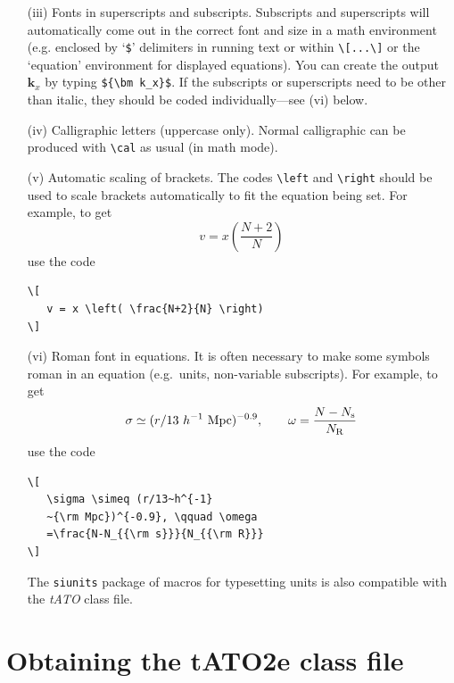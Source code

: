 \documentclass{tATO2e}
\begin{document}
\begin{enumerate}
\noindent you would use the following code:

\begin{verbatim}
The high-resolution observations were made along a line at an
angle of $-15^\circ$ (East from North) from the axis of the
jet---which runs North--South
\end{verbatim}

\item[(iii)] Fonts in superscripts and subscripts. Subscripts and superscripts will automatically come  out in the correct font
and size in a math environment (e.g. enclosed by `\verb"$"'
delimiters in running text or within \verb"\[...\]" or the
`equation' environment for displayed equations). You can create
the output ${\bm k_x}$ by typing \verb"${\bm k_x}$". If the
subscripts or superscripts need to be other than italic, they
should be coded individually---see (vi) below.

\item[(iv)] Calligraphic letters (uppercase only).
Normal calligraphic can be produced with \verb"\cal" as usual (in
math mode).

\item[(v)] Automatic scaling of brackets. The codes \verb"\left" and
\verb"\right" should  be used to scale brackets automatically to
fit the equation being set. For example, to get
\[
   v = x \left( \frac{N+2}{N} \right)
\]
use the code

\begin{verbatim}
\[
   v = x \left( \frac{N+2}{N} \right)
\]
\end{verbatim}

\item[(vi)] Roman font in equations. It is often necessary to make some
symbols roman in an equation (e.g.\ units, non-variable
subscripts). For example, to get
\[
   \sigma \simeq (r/13~h^{-1}~{\rm Mpc})^{-0.9},
   \qquad \omega = \frac{N-N_{\rm s}}{N_{\rm R}}
\]
\noindent use the code

\begin{verbatim}
\[
   \sigma \simeq (r/13~h^{-1}
   ~{\rm Mpc})^{-0.9}, \qquad \omega
   =\frac{N-N_{{\rm s}}}{N_{{\rm R}}}
\]
\end{verbatim}
The \texttt{siunits} package of macros for typesetting units is also compatible with the \textit{tATO} class file.
\end{enumerate}


\section{Obtaining the tATO2e class file}\label{FTP}
\end{document}
